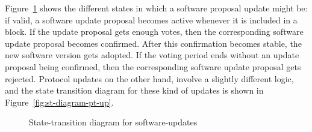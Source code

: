 Figure~\ref{fig:st-diagram-sw-up} shows the different states in which a
software proposal update might be: if valid, a software update proposal becomes
active whenever it is included in a block. If the update proposal gets enough
votes, then the corresponding software update proposal becomes confirmed. After
this confirmation becomes stable, the new software version gets adopted. If the
voting period ends without an update proposal being confirmed, then the
corresponding software update proposal gets rejected.
%
Protocol updates on the other hand, involve a slightly different logic, and the
state transition diagram for these kind of updates is shown in
Figure~\ref{fig:st-diagram-pt-up}.

\begin{figure}[ht]
  \centering

  \caption{State-transition diagram for software-updates}
  \label{fig:st-diagram-sw-up}
\end{figure}

